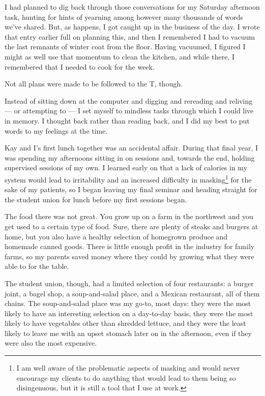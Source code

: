 I had planned to dig back through those conversations for my Saturday afternoon task, hunting for hints of yearning among however many thousands of words we've shared. But, as happens, I got caught up in the business of the day. I wrote that entry earlier full on planning this, and then I remembered I had to vacuum the last remnants of winter coat from the floor. Having vacuumed, I figured I might as well use that momentum to clean the kitchen, and while there, I remembered that I needed to cook for the week.

Not all plans were made to be followed to the T, though.

Instead of sitting down at the computer and digging and rereading and reliving --- or attempting to --- I set myself to mindless tasks through which I could live in memory. I thought back rather than reading back, and I did my best to put words to my feelings at the time.

Kay and I's first lunch together was an accidental affair. During that final year, I was spending my afternoons sitting in on sessions and, towards the end, holding supervised sessions of my own. I learned early on that a lack of calories in my system would lead to irritability and an increased difficulty in masking\footnote{I am well aware of the problematic aspects of masking and would never encourage my clients to do anything that would lead to them being so disingenuous, but it is still a tool that I use at work.} for the sake of my patients, so I began leaving my final seminar and heading straight for the student union for lunch before my first sessions began.

The food there was not great. You grow up on a farm in the northwest and you get used to a certain type of food. Sure, there are plenty of steaks and burgers at home, but you also have a healthy selection of homegrown produce and homemade canned goods. There is little enough profit in the industry for family farms, so my parents saved money where they could by growing what they were able to for the table.

The student union, though, had a limited selection of four restaurants: a burger joint, a bagel shop, a soup-and-salad place, and a Mexican restaurant, all of them chains. The soup-and-salad place was my go-to, most days: they were the most likely to have an interesting selection on a day-to-day basis, they were the most likely to have vegetables other than shredded lettuce, and they were the least likely to leave me with an upset stomach later on in the afternoon, even if they were also the most expensive.

